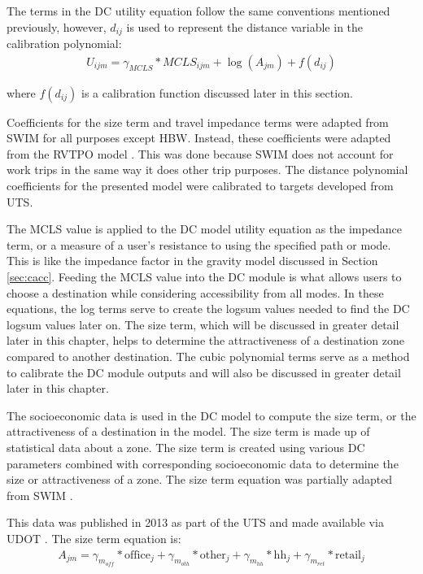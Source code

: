 The terms in the DC utility equation follow the same conventions mentioned
previously, however, \(d_{ij}\) is used to represent the distance variable in the calibration polynomial:
\begin{equation}
\begin{aligned}
	U_{ijm} = \gamma_{MCLS} * MCLS_{ijm} + \log (A_{jm}) + f(d_{ij})
\label{eqn:dc}
\end{aligned}
\end{equation}

\noindent where $f(d_{ij})$ is a calibration function discussed later in this section.

Coefficients for the
size term and travel impedance terms were adapted from SWIM \citep{swimversion}
for all purposes except HBW. Instead, these coefficients were
adapted from the RVTPO model \citep{rvtpoversion}. This was done because SWIM
does not account for work trips in the same way it does other trip purposes.
The distance polynomial coefficients for the presented model were
calibrated to targets developed from UTS.

The MCLS value is applied to the DC model utility equation as the impedance
term, or a measure of
a user’s resistance to using the specified path or mode. This is like the
impedance factor in the
gravity model discussed in Section \ref{sec:cacc}. Feeding the MCLS value into
the DC module is what allows
users to choose a destination while considering accessibility from all modes. In these
equations, the log terms serve to create the logsum values needed to find
the DC logsum values later on.
The size term, which
will be discussed in greater detail later in this chapter, helps to determine
the attractiveness
of a destination zone compared to another destination. The cubic polynomial
terms serve as a
method to calibrate the DC module outputs and will also be discussed in
greater detail later in
this chapter.

The socioeconomic data is used in the DC model to compute the size term, or
the attractiveness of
a destination in the model. The size term is made up of statistical
data about a zone. The size term is
created using various DC parameters combined with corresponding socioeconomic data
to determine the size or attractiveness of a zone. The size term equation was partially
adapted from SWIM \citep{swimversion}.

This data was published in 2013 as part of the UTS and made available via
UDOT \citep{uts2013}.  The size term
equation is:
\begin{equation}
\begin{aligned}
	A_{jm} = \gamma_{m_{off}} * \mathrm{office}_j + \gamma_{m_{oth}} * \mathrm{other}_j + \gamma_{m_{hh}} * \mathrm{hh}_j + \gamma_{m_{ret}} * \mathrm{retail}_j
	\label{eqn:sizeterm}
\end{aligned}
\end{equation}

